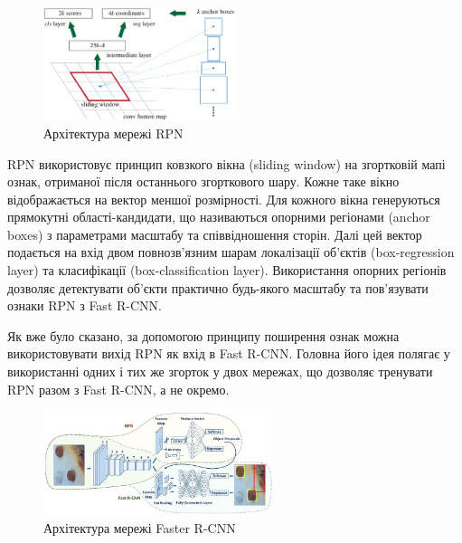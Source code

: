 \begin{figure}[H]
    \centering
    \includegraphics[width=0.5\textwidth]{images/cnn_faster_rcnn_rpn}
    \caption{Архітектура мережі RPN \cite{bib:faster_rcnn}
        \label{fig:cnn:faster_rcnn_rpn}
    }
\end{figure}
RPN використовує принцип ковзкого вікна (sliding window) на згортковій мапі ознак,
отриманої після останнього згорткового шару. Кожне таке вікно відображається
на вектор меншої розмірності. Для кожного вікна генеруються прямокутні області-кандидати,
що називаються опорними регіонами (anchor boxes) з параметрами масштабу та співвідношення сторін.
Далі цей вектор подається на вхід двом повнозв'язним
шарам локалізації об'єктів (box-regression layer) та класифікації (box-classification layer).
Використання опорних регіонів дозволяє детектувати об'єкти практично будь-якого масштабу та
пов'язувати ознаки RPN з Fast R-CNN.

Як вже було сказано, за допомогою принципу поширення ознак можна використовувати вихід RPN як вхід в Fast R-CNN.
Головна його ідея полягає у використанні одних і тих же згорток у двох мережах, що дозволяє тренувати
RPN разом з Fast R-CNN, а не окремо.

\begin{figure}[H]
    \centering
    \includegraphics[width=0.6\textwidth]{images/cnn_faster_rcnn_architecture}
    \caption{Архітектура мережі Faster R-CNN \cite{website:faster_rcnn}
        \label{fig:cnn:faster_rcnn_architecture}
    }
\end{figure}
